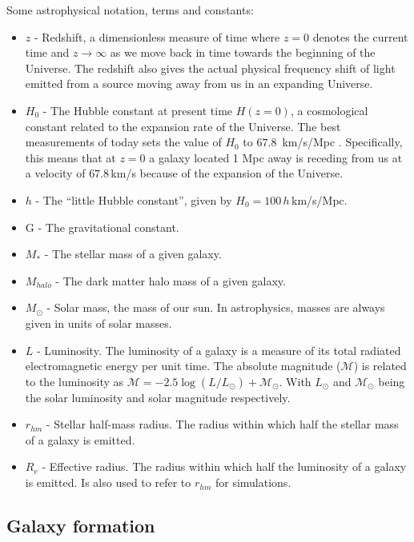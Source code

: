Some astrophysical notation, terms and constants:

\begin{itemize}
    \item $z$ - Redshift, a dimensionless measure of time where $z=0$ denotes the current time and $z \rightarrow \infty$ as we move back in time towards the beginning of the Universe. The redshift also gives the actual physical frequency shift of light emitted from a source moving away from us in an expanding Universe.
    \item $H_{0}$ - The Hubble constant at present time $H(z=0)$, a cosmological constant related to the expansion rate of the Universe. The best measurements of today sets the value of $H_0$ to $67.8\, $ km/s/Mpc \parencite{Planck2016}. Specifically, this means that at $z=0$ a galaxy located 1 Mpc away is receding from us at a velocity of $67.8\,$km/s because of the expansion of the Universe.
    \item $h$ - The ``little Hubble constant'', given by $H_0 = 100\,h\,$km/s/Mpc.
    \item G - The gravitational constant. 
    \item $M_{\ast}$ - The stellar mass of a given galaxy.
    \item $M_{halo}$ - The dark matter halo mass of a given galaxy.
    \item $M_{\odot}$ - Solar mass, the mass of our sun. In astrophysics, masses are always given in units of solar masses.
    \item $L$ - Luminosity. The luminosity of a galaxy is a measure of its total radiated electromagnetic energy per unit time. The absolute magnitude ($\mathcal{M}$) is related to the luminosity as $\mathcal{M} = -2.5 \log(L/L_\odot) + \mathcal{M}_\odot$. With $L_\odot$ and $\mathcal{M}_\odot$ being the solar luminosity and solar magnitude respectively.
    \item $r_{hm}$ - Stellar half-mass radius. The radius within which half the stellar mass of a galaxy is emitted.
    \item $R_e$ - Effective radius. The radius within which half the luminosity of a galaxy is emitted. Is also used to refer to $r_{hm}$ for simulations.
\end{itemize}

\subsection{Galaxy formation}

